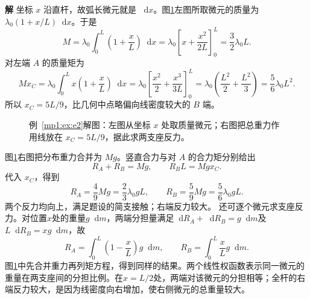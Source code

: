 \documentclass[11pt,openany,fontset=fandol]{ctexbook}
\theoremstyle{definition}\newtheorem{example}{例}[chapter]\newtheorem{exercise}{习题}[chapter]
\newcommand{\SolutionStart}{\par\medskip\ifdim\pagetotal>0pt\ifdim\dimexpr\pagegoal-\pagetotal\relax<3\baselineskip\newpage\fi\fi\noindent\textbf{解}\quad\ignorespaces}
\newenvironment{solution}{\SolutionStart}{\par\medskip}
\newcommand{\dd}{\mathop{}\!\mathrm d}\newcommand{\ee}{\mathrm e}\newcommand{\vct}[1]{\bm{#1}}
\begin{document}
\begin{solution}
坐标 $x$ 沿直杆，故弧长微元就是 $\dd x$。图\ref{mp1:fig:e2-s}左图所取微元的质量为 $\lambda_0(1+x/L)\dd x$。于是
\[
M=\lambda_0\int_0^L\left(1+\frac xL\right)\dd x
=\lambda_0\left[x+\frac{x^2}{2L}\right]_0^L
=\frac32\lambda_0L.
\]
对左端 $A$ 的质量矩为
\[
Mx_C=\lambda_0\int_0^Lx\left(1+\frac xL\right)\dd x
=\lambda_0\left[\frac{x^2}{2}+\frac{x^3}{3L}\right]_0^L
=\lambda_0\left(\frac{L^2}{2}+\frac{L^2}{3}\right)
=\frac56\lambda_0L^2.
\]
所以 $x_C=5L/9$，比几何中点略偏向线密度较大的 $B$ 端。

\begin{figure}[H]\centering

\caption{例~\ref{mp1:ex:e2}解图：左图从坐标 $x$ 处取质量微元；右图把总重力作用线放在 $x_C=5L/9$，据此求两支座反力。}\label{mp1:fig:e2-s}
\end{figure}

图\ref{mp1:fig:e2-s}右图把分布重力合并为 $Mg$。竖直合力与对 $A$ 的合力矩分别给出
\[
R_A+R_B=Mg,\qquad R_BL=Mgx_C.
\]
代入 $x_C$，得到
\[
R_A=\frac49Mg=\frac23\lambda_0gL,\qquad
R_B=\frac59Mg=\frac56\lambda_0gL.
\]
两个反力均向上，满足题设的简支接触；右端反力较大。
还可逐个微元求支座反力。对位置$x$处的重量$g\dd m$，两端分担量满足$\dd R_A+\dd R_B=g\dd m$及$L\dd R_B=xg\dd m$，故
\[
 R_A=\int_0^L\left(1-\frac xL\right)g\dd m,\qquad
 R_B=\int_0^L\frac xL g\dd m.
\]
图\ref{mp1:fig:e2-s}中先合并重力再列矩方程，得到同样的结果。两个线性权函数表示同一微元的重量在两支座间的分担比例。在$x=L/2$处，两端对该微元的分担相等；全杆的右端反力较大，是因为线密度向右增加，使右侧微元的总重量较大。
\end{solution}
\end{document}
